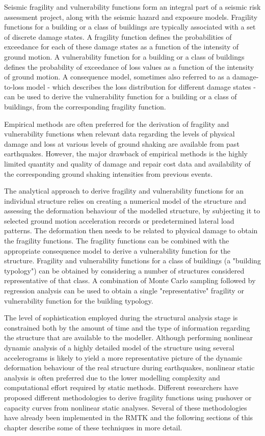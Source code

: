 Seismic fragility and vulnerability functions form an integral part of a seismic risk assessment project, along with the seismic hazard and exposure models. Fragility functions for a building or a class of buildings are typically associated with a set of discrete damage states. A fragility function defines the probabilities of exceedance for each of these damage states as a function of the intensity of ground motion. A vulnerability function for a building or a class of buildings defines the probability of exceedance of loss values as a function of the intensity of ground motion. A consequence model, sometimes also referred to as a damage-to-loss model - which describes the loss distribution for different damage states - can be used to derive the vulnerability function for a building or a class of buildings, from the corresponding fragility function.

Empirical methods are often preferred for the derivation of fragility and vulnerability functions when relevant data regarding the levels of physical damage and loss at various levels of ground shaking are available from past earthquakes. However, the major drawback of empirical methods is the highly limited quantity and quality of damage and repair cost data and availability of the corresponding ground shaking intensities from previous events.

The analytical approach to derive fragility and vulnerability functions for an individual structure relies on creating a numerical model of the structure and assessing the deformation behaviour of the modelled structure, by subjecting it to selected ground motion acceleration records or predetermined lateral load patterns. The deformation then needs to be related to physical damage to obtain the fragility functions. The fragility functions can be combined with the appropriate consequence model to derive a vulnerability function for the structure. Fragility and vulnerability functions for a class of buildings (a "building typology") can be obtained by considering a number of structures considered representative of that class. A combination of Monte Carlo sampling followed by regression analysis can be used to obtain a single "representative" fragility or vulnerability function for the building typology.

The level of sophistication employed during the structural analysis stage is constrained both by the amount of time and the type of information regarding the structure that are available to the modeller. Although performing nonlinear dynamic analysis of a highly detailed model of the structure using several accelerograms is likely to yield a more representative picture of the dynamic deformation behaviour of the real structure during earthquakes, nonlinear static analysis is often preferred due to the lower modelling complexity and computational effort required by static methods. Different researchers have proposed different methodologies to derive fragility functions using pushover or capacity curves from nonlinear static analyses. Several of these methodologies have already been implemented in the RMTK and the following sections of this chapter describe some of these techniques in more detail.